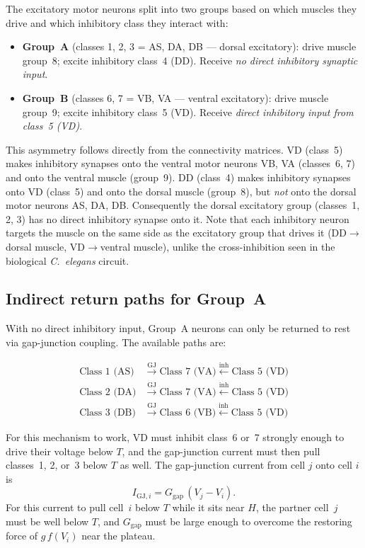\documentclass[11pt]{article}
\begin{document}
The excitatory motor neurons split into two groups based on which muscles they drive and which
inhibitory class they interact with:

\begin{itemize}
    \item \textbf{Group~A} (classes 1, 2, 3 = AS, DA, DB --- dorsal excitatory): drive muscle
          group~8; excite inhibitory class~4 (DD).  Receive \emph{no direct inhibitory synaptic
          input}.
    \item \textbf{Group~B} (classes 6, 7 = VB, VA --- ventral excitatory): drive muscle group~9;
          excite inhibitory class~5 (VD).  Receive \emph{direct inhibitory input from class~5
          (VD)}.
\end{itemize}

This asymmetry follows directly from the connectivity matrices.  VD (class~5) makes inhibitory
synapses onto the ventral motor neurons VB, VA (classes~6, 7) and onto the ventral muscle
(group~9).  DD (class~4) makes inhibitory synapses onto VD (class~5) and onto the dorsal muscle
(group~8), but \emph{not} onto the dorsal motor neurons AS, DA, DB.  Consequently the dorsal
excitatory group (classes~1, 2, 3) has no direct inhibitory synapse onto it.  Note that each
inhibitory neuron targets the muscle on the same side as the excitatory group that drives it
(DD$\to$dorsal muscle, VD$\to$ventral muscle), unlike the cross-inhibition seen in the biological
\textit{C.~elegans} circuit.

\subsection{Indirect return paths for Group~A}

With no direct inhibitory input, Group~A neurons can only be returned to rest via gap-junction
coupling.  The available paths are:

\begin{align*}
    \text{Class~1 (AS)} &\xrightarrow{\mathrm{GJ}} \text{Class~7 (VA)} \xleftarrow{\mathrm{inh}} \text{Class~5 (VD)} \\
    \text{Class~2 (DA)} &\xrightarrow{\mathrm{GJ}} \text{Class~7 (VA)} \xleftarrow{\mathrm{inh}} \text{Class~5 (VD)} \\
    \text{Class~3 (DB)} &\xrightarrow{\mathrm{GJ}} \text{Class~6 (VB)} \xleftarrow{\mathrm{inh}} \text{Class~5 (VD)}
\end{align*}

For this mechanism to work, VD must inhibit class~6 or~7 strongly enough to drive their voltage
below $T$, and the gap-junction current must then pull classes~1, 2, or~3 below $T$ as well.
The gap-junction current from cell $j$ onto cell $i$ is
\begin{equation}
    I_{\mathrm{GJ},i} = G_{\mathrm{gap}}\,(V_j - V_i).
\end{equation}
For this current to pull cell~$i$ below $T$ while it sits near $H$, the partner cell~$j$ must
be well below $T$, and $G_{\mathrm{gap}}$ must be large enough to overcome the restoring force of
$g\,f(V_i)$ near the plateau.
\end{document}
